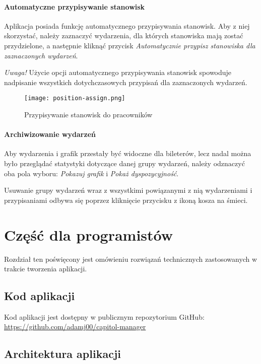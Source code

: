 \documentclass[shortabstract]{iithesis}
\begin{document}
\subsubsection{Automatyczne przypisywanie stanowisk}

Aplikacja posiada funkcję automatycznego przypisywania stanowisk. Aby z niej skorzystać, należy zaznaczyć wydarzenia, dla których stanowiska mają zostać przydzielone, a następnie kliknąć przycisk \textit{Automatycznie przypisz stanowiska dla zaznaczonych wydarzeń}.

\textit{Uwaga!} Użycie opcji automatycznego przypisywania stanowisk spowoduje nadpisanie wszystkich dotychczasowych przypisań dla zaznaczonych wydarzeń.

\begin{figure}[H]
    \centering
    \texttt{[image: position-assign.png]}
    \caption{Przypisywanie stanowisk do pracowników}
    \label{fig:enter-label}
\end{figure}

\subsubsection{Archiwizowanie wydarzeń}

Aby wydarzenia i grafik przestały być widoczne dla bileterów, lecz nadal można było przeglądać statystyki dotyczące danej grupy wydarzeń, należy odznaczyć oba pola wyboru: \textit{Pokazuj grafik} i \textit{Pokaż dyspozycyjność}.

Usuwanie grupy wydarzeń wraz z wszystkimi powiązanymi z nią wydarzeniami i przypisaniami odbywa się poprzez kliknięcie przycisku z ikoną kosza na śmieci.

\chapter{Część dla programistów}

Rozdział ten poświęcony jest omówieniu rozwiązań technicznych zastosowanych w trakcie tworzenia aplikacji.

\section{Kod aplikacji}

Kod aplikacji jest dostępny w publicznym repozytorium GitHub: \url{https://github.com/adamj00/capitol-manager}

\section{Architektura aplikacji}
\end{document}
